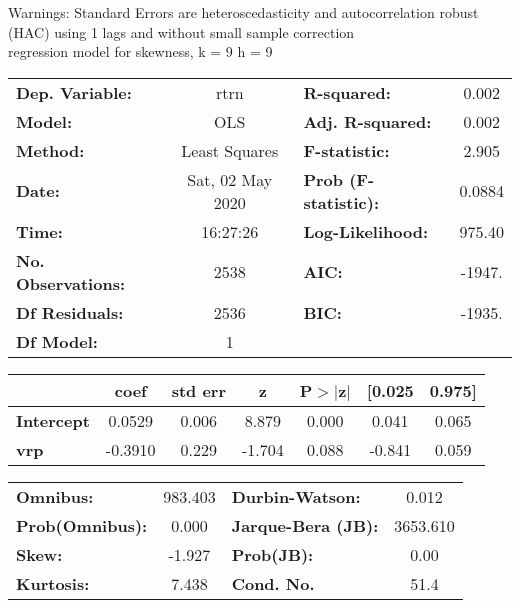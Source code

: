 Warnings: \newline
 [1] Standard Errors are heteroscedasticity and autocorrelation robust (HAC) using 1 lags and without small sample correction\\ 

regression model for skewness, k = 9 h = 9\begin{center}
\begin{tabular}{lclc}
\toprule
\textbf{Dep. Variable:}    &       rtrn       & \textbf{  R-squared:         } &     0.002   \\
\textbf{Model:}            &       OLS        & \textbf{  Adj. R-squared:    } &     0.002   \\
\textbf{Method:}           &  Least Squares   & \textbf{  F-statistic:       } &     2.905   \\
\textbf{Date:}             & Sat, 02 May 2020 & \textbf{  Prob (F-statistic):} &   0.0884    \\
\textbf{Time:}             &     16:27:26     & \textbf{  Log-Likelihood:    } &    975.40   \\
\textbf{No. Observations:} &        2538      & \textbf{  AIC:               } &    -1947.   \\
\textbf{Df Residuals:}     &        2536      & \textbf{  BIC:               } &    -1935.   \\
\textbf{Df Model:}         &           1      & \textbf{                     } &             \\
\bottomrule
\end{tabular}
\begin{tabular}{lcccccc}
                   & \textbf{coef} & \textbf{std err} & \textbf{z} & \textbf{P$> |$z$|$} & \textbf{[0.025} & \textbf{0.975]}  \\
\midrule
\textbf{Intercept} &       0.0529  &        0.006     &     8.879  &         0.000        &        0.041    &        0.065     \\
\textbf{vrp}       &      -0.3910  &        0.229     &    -1.704  &         0.088        &       -0.841    &        0.059     \\
\bottomrule
\end{tabular}
\begin{tabular}{lclc}
\textbf{Omnibus:}       & 983.403 & \textbf{  Durbin-Watson:     } &    0.012  \\
\textbf{Prob(Omnibus):} &   0.000 & \textbf{  Jarque-Bera (JB):  } & 3653.610  \\
\textbf{Skew:}          &  -1.927 & \textbf{  Prob(JB):          } &     0.00  \\
\textbf{Kurtosis:}      &   7.438 & \textbf{  Cond. No.          } &     51.4  \\
\bottomrule
\end{tabular}
\end{center}

